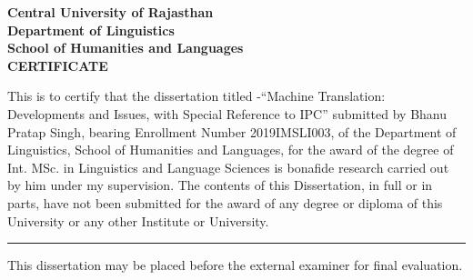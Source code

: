 \clearpage

\begin{center}
\textbf{
    Central University of Rajasthan\\
    Department of Linguistics\\
    School of Humanities and Languages\\
    }
    \vspace{2cm}
\textbf{\large CERTIFICATE}
\end{center}

\noindent


\vspace{0.5cm}
\onehalfspacing

This is to certify that the dissertation titled -``Machine Translation: Developments and Issues, with Special Reference to IPC” submitted by Bhanu Pratap Singh, bearing Enrollment Number 2019IMSLI003, of the Department of Linguistics, School of Humanities and Languages, for the award of the degree of Int. MSc. in Linguistics and Language Sciences is bonafide research carried out by him under my supervision. The contents of this Dissertation, in full or in parts, have not been submitted for the award of any degree or diploma of this University or any other Institute or University.

\vspace{2cm}


\noindent\rule{\linewidth}{0.1pt}
\noindent
This dissertation may be placed before the external examiner for final evaluation.

\vspace{2cm}


\doublespacing
\clearpage
